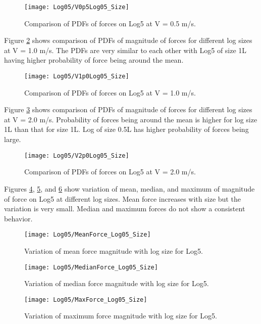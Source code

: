 \begin{figure}
\centering
\texttt{[image: Log05/V0p5Log05\_Size]}
\caption{\label{fig:V0p5Log05_Size}Comparison of PDFs of forces on Log5 at V = 0.5 m/s.}
\end{figure}

\noindent Figure \ref{fig:V1p0Log05_Size} shows comparison of PDFs of magnitude of forces for different log sizes at V = 1.0 m/s. The PDFs are very similar to each other with Log5 of size 1L having higher probability of force being around the mean.  

\begin{figure}
\centering
\texttt{[image: Log05/V1p0Log05\_Size]}
\caption{\label{fig:V1p0Log05_Size}Comparison of PDFs of forces on Log5 at V = 1.0 m/s.}
\end{figure}

\noindent Figure \ref{fig:V2p0Log05_Size} shows comparison of PDFs of magnitude of forces for different log sizes at V = 2.0 m/s. Probability of forces being around the mean is higher for log size 1L than that for size 1L. Log of size 0.5L has higher probability of forces being large.

\begin{figure}
\centering
\texttt{[image: Log05/V2p0Log05\_Size]}
\caption{\label{fig:V2p0Log05_Size}Comparison of PDFs of forces on Log5 at V = 2.0 m/s.}
\end{figure}

\noindent Figures \ref{fig:MeanForce_Log05_Size}, \ref{fig:MedianForce_Log05_Size}, and \ref{fig:MaxForce_Log05_Size} show variation of mean, median, and maximum of magnitude of force on Log5 at different log sizes. Mean force increases with size but the variation is very small. Median and maximum forces do not show a consistent behavior. 

\begin{figure}
\centering
\texttt{[image: Log05/MeanForce\_Log05\_Size]}
\caption{\label{fig:MeanForce_Log05_Size}Variation of mean force magnitude with log size for Log5.}
\end{figure}
\begin{figure}
\centering
\texttt{[image: Log05/MedianForce\_Log05\_Size]}
\caption{\label{fig:MedianForce_Log05_Size}Variation of median force magnitude with log size for Log5.}
\end{figure}
\begin{figure}
\centering
\texttt{[image: Log05/MaxForce\_Log05\_Size]}
\caption{\label{fig:MaxForce_Log05_Size}Variation of maximum force magnitude with log size for Log5.}
\end{figure}

